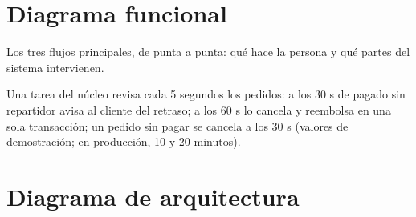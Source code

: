 \documentclass[11pt]{article}
\begin{document}
\section{Diagrama funcional}

Los tres flujos principales, de punta a punta: qué hace la persona y qué partes del sistema intervienen.

\begin{center}

\end{center}

\begin{nota}
Una tarea del núcleo revisa cada 5 segundos los pedidos: a los 30 s de pagado sin repartidor avisa al
cliente del retraso; a los 60 s lo cancela y reembolsa en una sola transacción; un pedido sin pagar se
cancela a los 30 s (valores de demostración; en producción, 10 y 20 minutos).
\end{nota}

\section{Diagrama de arquitectura}

\begin{center}

\end{center}
\end{document}
